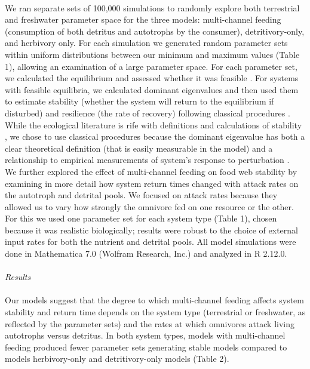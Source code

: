 \documentclass[12pt,a4paper,oneside]{article}
\begin{document}
\\
\indent We ran separate sets of 100,000 simulations to randomly explore both
terrestrial and freshwater parameter space for the three models: multi-channel feeding (consumption of both detritus and autotrophs by the consumer), detritivory-only, and herbivory only. For each simulation we generated random
parameter sets within uniform distributions between our
minimum and maximum values (Table 1), allowing an examination of a
large parameter space. For each parameter set, we calculated the equilibrium
and assessed whether it was feasible \citep[i.e., all pools had positive
equilibrium values, \emph{sensu}][]{roberts1974}. For systems
with feasible equilibria, we calculated dominant eigenvalues and then used
them to estimate stability (whether the system will return to the
equilibrium if disturbed) and resilience (the rate of recovery)
following classical procedures \citep{May:1973}. While the ecological literature is rife
with definitions and calculations of stability \citep{Grimm:1997},
we chose to use classical procedures
because the dominant eigenvalue has both a clear theoretical definition (that is easily
measurable in the model) and a relationship to empirical
measurements of system's response to perturbation
\citep{Cottingham:1994,Jorgensen:2000}.
\\
\indent We further explored the effect of multi-channel feeding on food web stability by
examining in more detail how system return times
changed with attack rates on the autotroph and detrital pools. We
focused on attack rates because they allowed us to vary how strongly
the omnivore fed on one resource or the other. For
this we used one parameter set for each system type (Table 1), chosen because it
was realistic biologically; results were robust to the choice
of external input rates for both the nutrient and detrital pools. All
model simulations were done in Mathematica 7.0 (Wolfram Research, Inc.) and
analyzed in R 2.12.0.
\\
\\
\emph{Results}\\
\\
\indent Our models suggest that the degree to which multi-channel feeding affects system stability and return time depends on the system type
(terrestrial or freshwater, as reflected by the parameter sets) and the rates at which omnivores attack living
autotrophs versus detritus. In both system types, models with multi-channel feeding produced fewer parameter sets generating stable models compared to models herbivory-only and detritivory-only models (Table 2). 
\end{document}
